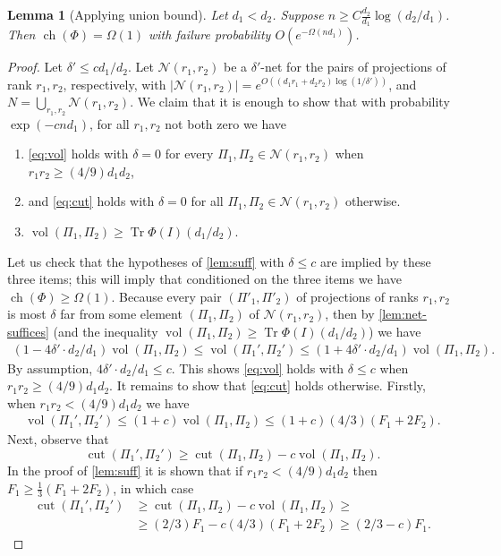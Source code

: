 \documentclass[aos]{imsart}
\newtheorem{lemma}[theorem]{Lemma}
\theoremstyle{definition}
\numberwithin{equation}{section}
\DeclareMathOperator{\vol}{vol}
\DeclareMathOperator{\cut}{cut}
\DeclareMathOperator{\ch}{ch}
\DeclareMathOperator{\tr}{Tr}
\newcommand{\cN}{\mathcal{N}}
\begin{document}
\begin{appendix}
\begin{lemma}[Applying union bound]\label{lem:union}
Let $d_1 < d_2$. Suppose $n \geq C \frac{d_2}{d_1} \log (d_2/d_1)$. Then $\ch(\Phi) = \Omega(1)$ with failure probability $O(e^{- \Omega(n d_1)})$.
\end{lemma}
\begin{proof} Let $\delta' \leq c d_1/d_2$. Let $\cN(r_1, r_2)$ be a $\delta'$-net for the pairs of projections of rank $r_1, r_2$, respectively, with $|\cN(r_1, r_2)| = e^{O((d_1r_1 + d_2 r_2) \log(1/\delta'))}$, and $N = \bigcup_{r_1, r_2} \cN(r_1, r_2)$. We claim that it is enough to show that with probability $\exp( - c n d_1 )$, for all $r_1, r_2$ not both zero we have
\begin{enumerate}
\item \cref{eq:vol} holds with $\delta = 0$ for every $\Pi_1,\Pi_2 \in \cN(r_1, r_2)$ when $r_1 r_2 \geq (4/9) d_1 d_2$,
\item  and \cref{eq:cut} holds with $\delta =0$ for all $\Pi_1, \Pi_2 \in \cN(r_1, r_2)$ otherwise.
\item $\vol(\Pi_1, \Pi_2) \geq \tr \Phi(I) (d_1/d_2)$.
\end{enumerate}
Let us check that the hypotheses of \cref{lem:suff} with $\delta \leq c$ are implied by these three items; this will imply that conditioned on the three items we have $\ch(\Phi) \geq \Omega(1)$. Because every pair $(\Pi'_1,\Pi'_2)$ of projections of ranks $r_1,r_2$ is most $\delta$ far from some element $(\Pi_1, \Pi_2)$ of $\cN(r_1,r_2)$, then by \cref{lem:net-suffices} (and the inequality $\vol(\Pi_1, \Pi_2) \geq \tr \Phi(I)(d_1/d_2)$) we have
\begin{align*} (1 - 4 \delta'  \cdot d_2/d_1) \vol(\Pi_1, \Pi_2) \leq  \vol(\Pi_1', \Pi_2') \leq  (1 + 4 \delta'  \cdot d_2/d_1) \vol(\Pi_1, \Pi_2).\end{align*}
By assumption, $4 \delta' \cdot d_2/d_1 \leq c$. This shows \cref{eq:vol} holds with $\delta \leq c$ when $r_1 r_2 \geq (4/9) d_1 d_2$. It remains to show that \cref{eq:cut} holds otherwise. Firstly, when $r_1 r_2 < (4/9) d_1 d_2$ we have
\begin{gather} \vol(\Pi_1', \Pi_2') \leq (1 + c) \vol(\Pi_1, \Pi_2) \leq  (1 + c)(4/3)(F_1 + 2 F_2).\label{eq:not-net-9a}\end{gather}
  Next, observe that
$$  \cut(\Pi_1', \Pi_2') \geq \cut(\Pi_1, \Pi_2) - c \vol(\Pi_1, \Pi_2).$$
In the proof of \cref{lem:suff} it is shown that if $r_1 r_2 < (4/9) d_1 d_2$ then $F_1 \geq \frac{1}{3} (F_1 + 2 F_2)$, in which case
\begin{align}
\cut(\Pi_1', \Pi_2') &\geq \cut(\Pi_1, \Pi_2) - c \vol(\Pi_1, \Pi_2) \geq \nonumber\\
& \geq (2/3) F_1 -  c (4/3)(F_1 + 2 F_2) \geq (2/3 - c) F_1.\label{eq:not-net-9b}
\end{align}


\end{proof}
\end{appendix}
\end{document}
